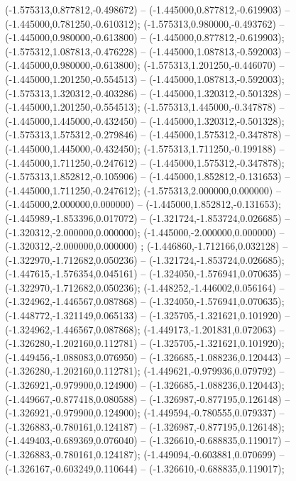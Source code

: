  (-1.575313,0.877812,-0.498672) -- (-1.445000,0.877812,-0.619903) -- (-1.445000,0.781250,-0.610312);
 (-1.575313,0.980000,-0.493762) -- (-1.445000,0.980000,-0.613800) -- (-1.445000,0.877812,-0.619903);
 (-1.575312,1.087813,-0.476228) -- (-1.445000,1.087813,-0.592003) -- (-1.445000,0.980000,-0.613800);
 (-1.575313,1.201250,-0.446070) -- (-1.445000,1.201250,-0.554513) -- (-1.445000,1.087813,-0.592003);
 (-1.575313,1.320312,-0.403286) -- (-1.445000,1.320312,-0.501328) -- (-1.445000,1.201250,-0.554513);
 (-1.575313,1.445000,-0.347878) -- (-1.445000,1.445000,-0.432450) -- (-1.445000,1.320312,-0.501328);
 (-1.575313,1.575312,-0.279846) -- (-1.445000,1.575312,-0.347878) -- (-1.445000,1.445000,-0.432450);
 (-1.575313,1.711250,-0.199188) -- (-1.445000,1.711250,-0.247612) -- (-1.445000,1.575312,-0.347878);
 (-1.575313,1.852812,-0.105906) -- (-1.445000,1.852812,-0.131653) -- (-1.445000,1.711250,-0.247612);
 (-1.575313,2.000000,0.000000) -- (-1.445000,2.000000,0.000000) -- (-1.445000,1.852812,-0.131653);
 (-1.445989,-1.853396,0.017072) -- (-1.321724,-1.853724,0.026685) -- (-1.320312,-2.000000,0.000000);
 (-1.445000,-2.000000,0.000000) -- (-1.320312,-2.000000,0.000000) ;
 (-1.446860,-1.712166,0.032128) -- (-1.322970,-1.712682,0.050236) -- (-1.321724,-1.853724,0.026685);
 (-1.447615,-1.576354,0.045161) -- (-1.324050,-1.576941,0.070635) -- (-1.322970,-1.712682,0.050236);
 (-1.448252,-1.446002,0.056164) -- (-1.324962,-1.446567,0.087868) -- (-1.324050,-1.576941,0.070635);
 (-1.448772,-1.321149,0.065133) -- (-1.325705,-1.321621,0.101920) -- (-1.324962,-1.446567,0.087868);
 (-1.449173,-1.201831,0.072063) -- (-1.326280,-1.202160,0.112781) -- (-1.325705,-1.321621,0.101920);
 (-1.449456,-1.088083,0.076950) -- (-1.326685,-1.088236,0.120443) -- (-1.326280,-1.202160,0.112781);
 (-1.449621,-0.979936,0.079792) -- (-1.326921,-0.979900,0.124900) -- (-1.326685,-1.088236,0.120443);
 (-1.449667,-0.877418,0.080588) -- (-1.326987,-0.877195,0.126148) -- (-1.326921,-0.979900,0.124900);
 (-1.449594,-0.780555,0.079337) -- (-1.326883,-0.780161,0.124187) -- (-1.326987,-0.877195,0.126148);
 (-1.449403,-0.689369,0.076040) -- (-1.326610,-0.688835,0.119017) -- (-1.326883,-0.780161,0.124187);
 (-1.449094,-0.603881,0.070699) -- (-1.326167,-0.603249,0.110644) -- (-1.326610,-0.688835,0.119017);
